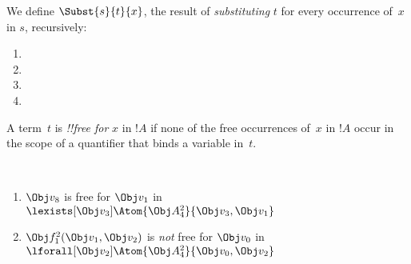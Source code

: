 \documentclass[../../../include/open-logic-section]{subfiles}
\begin{document}

\begin{defn}
We define $\Subst{s}{t}{x}$, the result of \emph{substituting} $t$
for every occurrence of~$x$ in $s$, recursively:
\begin{enumerate}
\item {}

\item {}

\item {}

\item{}
\end{enumerate}
\end{defn}

\begin{defn}
A term~$t$ is \emph{!!{free for}} $x$ in $!A$ if none of the free
occurrences of~$x$ in $!A$ occur in the scope of a quantifier that
binds a variable in~$t$.
\end{defn}

\begin{ex} ~
\begin{enumerate}
\item $\Obj v_8$ is free for $\Obj v_1$ in $\lexists[\Obj
  v_3]\Atom{\Obj A^2_4}{\Obj v_3,\Obj v_1}$

\item $\Obj f^2_1(\Obj v_1, \Obj v_2)$ is \emph{not} free for $\Obj
  v_0$ in $\lforall[\Obj v_2]\Atom{\Obj A^2_4}{\Obj v_0,\Obj v_2}$
\end{enumerate}
\end{ex}
\end{document}
